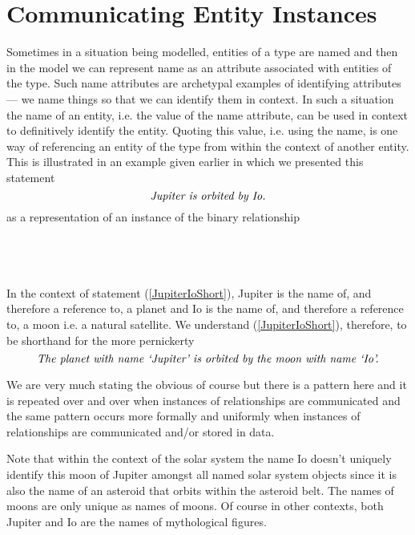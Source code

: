 \section{Communicating Entity Instances}
\label{CommunicatingEntityInstances}

\begin{newtt}
\mynote
Sometimes in a situation being modelled, entities of a type are named and then in the model
we can represent name as an attribute associated with entities of the type.  
Such name attributes are archetypal examples of identifying attributes --- we name things so that we can identify them in context. In such a situation the name of an entity, i.e. the value of the name attribute,  can be used in context to definitively identify the entity.
Quoting this value, i.e. using the name, is one way of referencing an entity of the type from within the context of another entity. This is illustrated in  an example given earlier in which we presented this statement
\begin{equation}
\label{JupiterIoShort}
\mbox{\textit{Jupiter is orbited by Io.}}
\end{equation}
as a representation of an instance of the binary relationship
\begin{gather}
\label{planetMoonSecondInstance}
\raisebox{-1cm}{

}
\end{gather}

In the context of statement (\ref{JupiterIoShort}), Jupiter is the name of, and therefore  a reference to, a planet and  Io is the name of, and therefore a reference to, a moon i.e. a natural satellite.  
We understand  (\ref{JupiterIoShort}), therefore, to be shorthand for the 
more pernickerty 
\begin{equation}
\mbox{\textit{The planet with name `Jupiter' is orbited by the moon with name `Io'.}}
\end{equation}

\mynote
We are very much stating the obvious of course but there is a pattern here and it is repeated over and over when instances of relationships are communicated  and the same pattern occurs more formally  and uniformly when instances of relationships are communicated and/or stored in data.

\mynote
Note that within the context of the solar system the name Io  doesn't uniquely identify this moon of Jupiter amongst all named solar system objects since it is also the name of an asteroid that orbits within the asteroid belt.
The names of moons are only unique as names of moons. 
Of course in other contexts, both Jupiter and Io are the names of mythological figures. 


\end{newtt}
